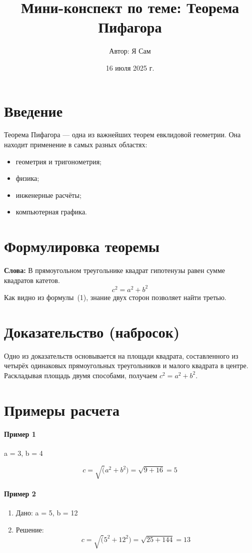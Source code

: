 \documentclass{article}
\title{Мини-конспект по теме: Теорема Пифагора}
\author{Автор: Я Сам}
\date{16 июля 2025 г.}
\begin{document}
\maketitle
\tableofcontents{}
\newpage
\section{Введение}
Теорема Пифагора --- одна из важнейших теорем евклидовой геометрии. Она находит применение в самых разных областях:
\begin{itemize}
    \item геометрия и тригонометрия;
    \item физика;
    \item инженерные расчёты;
    \item компьютерная графика.
\end{itemize}

\section{Формулировка теоремы}
\textbf{Слова:} В прямоугольном треугольнике квадрат гипотенузы равен сумме квадратов катетов.
\begin{equation}
    c^2 = a^2 + b^2
\end{equation}
Как видно из формулы~(1), знание двух сторон позволяет найти третью.

\section{Доказательство (набросок)}
Одно из доказательств основывается на площади квадрата, составленного
из четырёх одинаковых прямоугольных треугольников и малого квадрата
в центре. Раскладывая площадь двумя способами, получаем \(c^2 = a^2 + b^2\).

\section{Примеры расчета}
\paragraph{Пример 1}
\begin{center}
    a = 3, b = 4
\end{center}
\[
    c = \sqrt(a^2 + b^2) = \sqrt{9 + 16} = 5
\]
\paragraph{Пример 2}
\begin{enumerate}
    \item Дано: a = 5, b = 12
    \item Решение: 
    \[
        c = \sqrt(5^2 + 12^2) = \sqrt{25 + 144} = 13
    \]
\end{enumerate}
\end{document}
